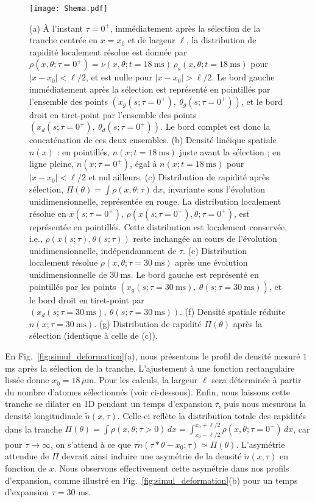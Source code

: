 \begin{figure}[!htb]
	\centering
	\texttt{[image: Shema.pdf]}
	\label{fig:BiPart.coupure2}
	\caption{
(a) À l'instant $\tau = 0^+$, immédiatement après la sélection de la tranche centrée en $x = x_0$ et de largeur $\ell$, la distribution de rapidité localement résolue est donnée par $\rho(x,\theta ; \tau = 0^+) = \nu(x, \theta ; t = 18~\mathrm{ms}) \, \rho_s(x,\theta ; t = 18~\mathrm{ms})$ pour $\vert x - x_0 \vert < \ell/2$, et est nulle pour $\vert x - x_0 \vert > \ell/2$. Le bord gauche immédiatement après la sélection est représenté en pointillés par l’ensemble des points $(x_g(s; \tau = 0^+),\ \theta_g(s; \tau = 0^+))$, et le bord droit en tiret-point par l’ensemble des points $(x_d(s; \tau = 0^+),\ \theta_d(s; \tau = 0^+))$. Le bord complet est donc la concaténation de ces deux ensembles. 
(b) Densité linéique spatiale $n(x)$ : en pointillés, $n(x; t = 18~\mathrm{ms})$ juste avant la sélection ; en ligne pleine, $n(x; \tau = 0^+)$, égal à $n(x; t = 18~\mathrm{ms})$ pour $\vert x - x_0 \vert < \ell/2$ et nul ailleurs. 
(c) Distribution de rapidité après sélection, $\Pi(\theta) = \int \rho(x,\theta ; \tau)\,\mathrm{d}x$, invariante sous l’évolution unidimensionnelle, représentée en rouge. La distribution localement résolue en $x(s; \tau = 0^+)$, $\rho(x(s; \tau = 0^+), \theta ; \tau = 0^+)$, est représentée en pointillés. Cette distribution est localement conservée, i.e., $\rho(x(s; \tau), \theta(s; \tau))$ reste inchangée au cours de l’évolution unidimensionnelle, indépendamment de $\tau$. 
(e) Distribution localement résolue $\rho(x, \theta ; \tau = 30~\mathrm{ms})$ après une évolution unidimensionnelle de $30~\mathrm{ms}$. Le bord gauche est représenté en pointillés par les points $(x_g(s; \tau = 30~\mathrm{ms}),\ \theta(s; \tau = 30~\mathrm{ms}))$, et le bord droit en tiret-point par $(x_d(s; \tau = 30~\mathrm{ms}),\ \theta(s; \tau = 30~\mathrm{ms}))$. 
(f) Densité spatiale réduite $n(x; \tau = 30~\mathrm{ms})$. 
(g) Distribution de rapidité $\Pi(\theta)$ après la sélection (identique à celle de (c)).
}
	
\end{figure}
 
En Fig.~\ref{fig:simul_deformation}(a), nous présentons le profil de densité mesuré $1$ ms après la sélection de la tranche.  
L’ajustement à une fonction rectangulaire lissée donne $x_0 = 18\,\mu$m.  
Pour les calculs, la largeur $\ell$ sera déterminée à partir du nombre d’atomes sélectionnés (voir ci-dessous).  
Enfin, nous laissons cette tranche se dilater en 1D pendant un temps d’expansion $\tau$, puis nous mesurons la densité longitudinale $\tilde{n}(x,\tau)$.  
Celle-ci reflète la distribution totale des rapidités dans la tranche $\Pi(\theta) = \int \rho(x, \theta ; \tau > 0)\, dx = \int_{x_0 - \ell/2}^{x_0 + \ell/2} \rho(x, \theta ; \tau = 0^+)\, dx$, car pour $\tau \rightarrow \infty$, on s’attend à ce que $\tau \tilde{n}( \tau * \theta - x_0  ;\tau) \simeq \Pi(\theta)$.  
L’asymétrie attendue de $\Pi$ devrait ainsi induire une asymétrie de la densité $\tilde{n}(x,\tau)$ en fonction de $x$.  
Nous observons effectivement cette asymétrie dans nos profils d’expansion, comme illustré en Fig.~\ref{fig:simul_deformation}(b) pour un temps d’expansion $\tau=30$ ms.


